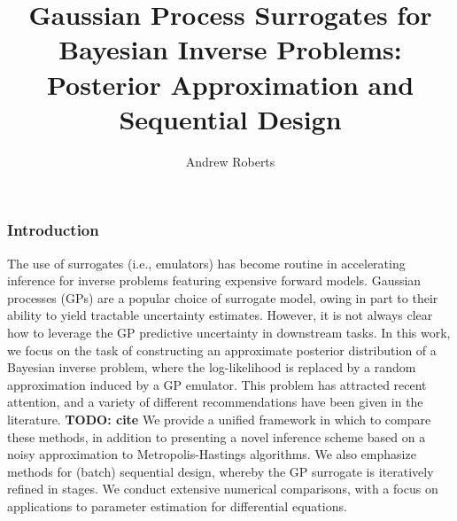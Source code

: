 \documentclass[12pt]{article}
\title{Gaussian Process Surrogates for Bayesian Inverse Problems: Posterior Approximation and Sequential Design}
\author{Andrew Roberts}
\begin{document}
\maketitle

\subsubsection*{Introduction}
The use of surrogates (i.e., emulators) has become routine in accelerating inference for inverse problems featuring expensive forward models. Gaussian processes (GPs) 
are a popular choice of surrogate model, owing in part to their ability to yield tractable uncertainty estimates. However, it is not always clear how to leverage the GP
predictive uncertainty in downstream tasks. In this work, we focus on the task of constructing an approximate posterior distribution of a Bayesian inverse problem, where
the log-likelihood is replaced by a random approximation induced by a GP emulator. This problem has attracted recent attention, and a variety of different recommendations 
have been given in the literature. \textbf{TODO: cite} We provide a unified framework in which to compare these methods, in addition to presenting a novel inference scheme
 based on a noisy approximation to Metropolis-Hastings algorithms. We also emphasize methods for (batch) sequential design, whereby the GP surrogate is iteratively refined 
 in stages. We conduct extensive numerical comparisons, with a focus on applications to parameter estimation for differential equations. 
\end{document}
